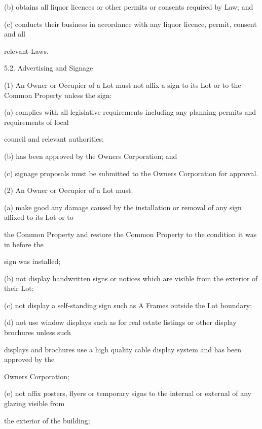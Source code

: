 \documentclass{article}
\begin{document}
{\fontsize{9.962}{1}(b) obtains all liquor licences or other permits or consents required by Law; and }

{\fontsize{9.962}{1}(c) conducts their business in accordance with any liquor licence, permit, consent and all }

{\fontsize{10.02}{1}relevant Laws. }

{\fontsize{9.99}{1}5.2. Advertising and Signage }

{\fontsize{9.962}{1}(1) An Owner or Occupier of a Lot must not affix a sign to its Lot or to the Common Property unless the sign: }

{\fontsize{9.962}{1}(a) complies with all legislative requirements including any planning permits and requirements of local }

{\fontsize{10.02}{1}council and relevant authorities; }

{\fontsize{9.962}{1}(b) has been approved by the Owners Corporation; and }

{\fontsize{9.962}{1}(c) signage proposals must be submitted to the Owners Corporation for approval. }

{\fontsize{9.962}{1}(2) An Owner or Occupier of a Lot must: }

{\fontsize{9.962}{1}(a) make good any damage caused by the installation or removal of any sign affixed to its Lot or to }

{\fontsize{10.02}{1}the Common Property and restore the Common Property to the condition it was in before the }

{\fontsize{10.02}{1}sign was installed; }

{\fontsize{9.962}{1}(b) not display handwritten signs or notices which are visible from the exterior of their Lot; }

{\fontsize{9.962}{1}(c) not display a self-standing sign such as A Frames outside the Lot boundary; }

{\fontsize{9.962}{1}(d) not use window displays such as for real estate listings or other display brochures unless such }

{\fontsize{10.02}{1}displays and brochures use a high quality cable display system and has been approved by the }

{\fontsize{10.02}{1}Owners Corporation; }

{\fontsize{9.962}{1}(e) not affix posters, flyers or temporary signs to the internal or external of any glazing visible from }

{\fontsize{10.02}{1}the exterior of the building; }
\end{document}
